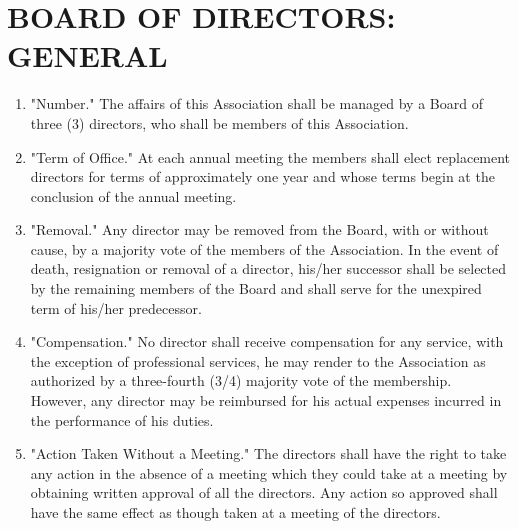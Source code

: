 \documentclass[12pt, letterpaper]{article}
\begin{document}
\section{BOARD OF DIRECTORS: GENERAL}
\begin{enumerate}
 \item "Number."
  The affairs of this Association shall be managed by a Board of three (3) directors, who shall be members of this Association.
 \item "Term of Office."
  At each annual meeting the members shall elect replacement directors for terms of approximately one year and whose terms begin at the conclusion of the annual meeting.
 \item "Removal."
  Any director may be removed from the Board, with or without cause, by a majority vote of the members of the Association.
  In the event of death, resignation or removal of a director, his/her successor shall be selected by the remaining members of the Board and shall serve for the unexpired term of his/her predecessor.
 \item "Compensation."
  No director shall receive compensation for any service, with the exception of professional services, he may render to the Association as authorized by a three-fourth (3/4) majority vote of the membership.
  However, any director may be reimbursed for his actual expenses incurred in the performance of his duties.
 \item "Action Taken Without a Meeting."
  The directors shall have the right to take any action in the absence of a meeting which they could take at a meeting by obtaining written approval of all the directors.
  Any action so approved shall have the same effect as though taken at a meeting of the directors.
\end{enumerate}

\end{document}
